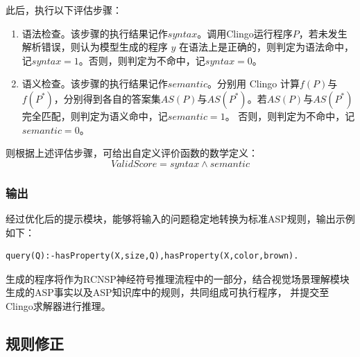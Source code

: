 此后，执行以下评估步骤：
\begin{enumerate}[nosep]
\item 语法检查。该步骤的执行结果记作$syntax$。调用Clingo运行程序$P$，若未发生解析错误，则认为模型生成的程序 $y$ 在语法上是正确的，则判定为语法命中，记$syntax = 1$。否则，则判定为不命中，记$syntax = 0$。
\item 语义检查。该步骤的执行结果记作$semantic$。分别用 Clingo 计算$f(P)$与$f(P^*)$，分别得到各自的答案集$AS(P)$与$AS(P^*)$。若$AS(P)$与$AS(P^*)$完全匹配，则判定为语义命中，记$semantic = 1$。
否则，则判定为不命中，记$semantic = 0$。
\end{enumerate}

则根据上述评估步骤，可给出自定义评价函数的数学定义：
$$ValidScore = syntax \land semantic $$
\subsubsection{输出}
经过优化后的提示模块，能够将输入的问题稳定地转换为标准ASP规则，输出示例如下：
\begin{lstlisting}
query(Q):-hasProperty(X,size,Q),hasProperty(X,color,brown).
\end{lstlisting}

生成的程序将作为RCNSP神经符号推理流程中的一部分，结合视觉场景理解模块生成的ASP事实以及ASP知识库中的规则，共同组成可执行程序，
并提交至Clingo求解器进行推理。
\subsection{规则修正}
